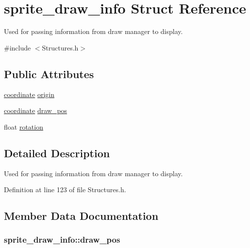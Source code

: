 \hypertarget{structsprite__draw__info}{\section{sprite\-\_\-draw\-\_\-info Struct Reference}
\label{structsprite__draw__info}
}


Used for passing information from draw manager to display.  




{\ttfamily \#include $<$Structures.\-h$>$}

\subsection*{Public Attributes}
\begin{DoxyCompactItemize}
\item 
\hyperlink{structcoordinate}{coordinate} \hyperlink{structsprite__draw__info_a7c12e335ba1fc83156a05a568d38a179}{origin}
\item 
\hyperlink{structcoordinate}{coordinate} \hyperlink{structsprite__draw__info_acf0a863cddf497e364e3cdc9c46b8564}{draw\-\_\-pos}
\item 
float \hyperlink{structsprite__draw__info_a41292dd9fa6ca00d553a6c93f18e2a40}{rotation}
\end{DoxyCompactItemize}


\subsection{Detailed Description}
Used for passing information from draw manager to display. 

Definition at line 123 of file Structures.\-h.



\subsection{Member Data Documentation}
\hypertarget{structsprite__draw__info_acf0a863cddf497e364e3cdc9c46b8564}{
\subsubsection[{draw\-\_\-pos}]{ sprite\-\_\-draw\-\_\-info\-::draw\-\_\-pos}}\label{structsprite__draw__info_acf0a863cddf497e364e3cdc9c46b8564}


